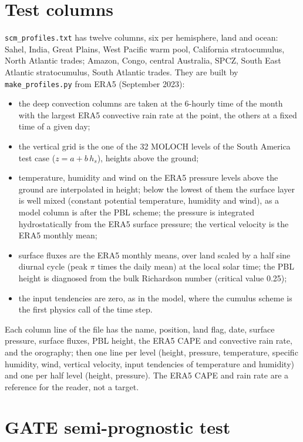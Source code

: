 \section{Test columns}

\verb=scm_profiles.txt= has twelve columns, six per hemisphere, land and
ocean: Sahel, India, Great Plains, West Pacific warm pool, California
stratocumulus, North Atlantic trades; Amazon, Congo, central Australia,
SPCZ, South East Atlantic stratocumulus, South Atlantic trades. They are
built by \verb=make_profiles.py= from ERA5 (September 2023):
\begin{itemize}
  \item the deep convection columns are taken at the 6-hourly time of the
        month with the largest ERA5 convective rain rate at the point, the
        others at a fixed time of a given day;
  \item the vertical grid is the one of the 32 MOLOCH levels of the South
        America test case ($z = a + b\,h_s$), heights above the ground;
  \item temperature, humidity and wind on the ERA5 pressure levels above
        the ground are interpolated in height; below the lowest of them the
        surface layer is well mixed (constant potential temperature,
        humidity and wind), as a model column is after the PBL scheme; the
        pressure is integrated hydrostatically from the ERA5 surface
        pressure; the vertical velocity is the ERA5 monthly mean;
  \item surface fluxes are the ERA5 monthly means, over land scaled by a
        half sine diurnal cycle (peak $\pi$ times the daily mean) at the
        local solar time; the PBL height is diagnosed from the bulk
        Richardson number (critical value 0.25);
  \item the input tendencies are zero, as in the model, where the cumulus
        scheme is the first physics call of the time step.
\end{itemize}
Each column line of the file has the name, position, land flag, date,
surface pressure, surface fluxes, PBL height, the ERA5 CAPE and convective
rain rate, and the orography; then one line per level (height, pressure,
temperature, specific humidity, wind, vertical velocity, input tendencies
of temperature and humidity) and one per half level (height, pressure).
The ERA5 CAPE and rain rate are a reference for the reader, not a target.

\section{GATE semi-prognostic test}

